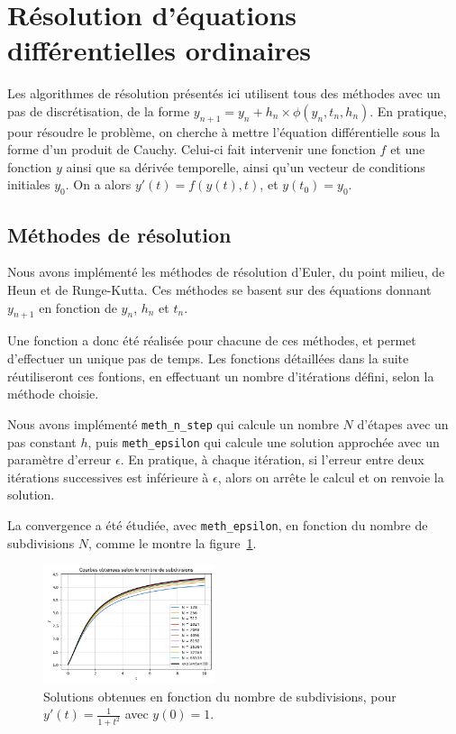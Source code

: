 \section{Résolution d'équations différentielles ordinaires}
Les algorithmes de résolution présentés ici utilisent tous des méthodes avec un pas de discrétisation, de la forme
$y_{n+1}=y_n+h_n \times \phi (y_n,t_n,h_n)$. En pratique, pour résoudre le problème, on cherche à mettre
l'équation différentielle sous la forme d'un produit de Cauchy.
Celui-ci fait intervenir une fonction $f$ et une fonction $y$ ainsi que sa dérivée temporelle, ainsi qu'un vecteur de conditions initiales $y_0$.
On a alors $y'(t)=f(y(t),t)$, et $y(t_0)=y_0$.

\subsection{Méthodes de résolution}
Nous avons implémenté les méthodes de résolution d’Euler, du point milieu, de Heun et de Runge-Kutta.
Ces méthodes se basent sur des équations donnant $y_{n+1}$ en fonction de $y_n$, $h_n$ et $t_n$.

Une fonction a donc été réalisée pour chacune de ces méthodes, et permet d'effectuer un unique pas de temps.
Les fonctions détaillées dans la suite réutiliseront ces fontions, en effectuant un nombre d'itérations défini, selon la méthode choisie.

Nous avons implémenté \texttt{meth\_n\_step} qui calcule un nombre $N$ d'étapes avec un pas constant $h$,
puis \texttt{meth\_epsilon} qui calcule une solution approchée avec un paramètre d’erreur $\epsilon$.
En pratique, à chaque itération, si l'erreur entre deux itérations successives est inférieure à $\epsilon$,
alors on arrête le calcul et on renvoie la solution.

La convergence a été étudiée, avec \texttt{meth\_epsilon}, en fonction du nombre de subdivisions $N$,
comme le montre la figure~\ref{fig:subdivision}.

\begin{figure}[htbp!]
	\centering
	\includegraphics[width=0.45\textwidth]{res/subdivisions}
	\caption{Solutions obtenues en fonction du nombre de subdivisions, pour $y'(t) = \frac{1}{1 + t^2}$ avec $y(0) = 1$.}
	\label{fig:subdivision}
\end{figure}

